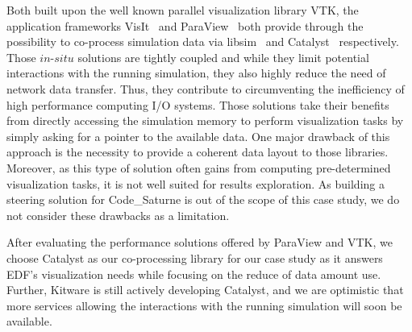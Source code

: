 Both built upon the well known parallel visualization library VTK, 
the application frameworks VisIt~\cite{1532795} and ParaView~\cite{964413} both provide through
the possibility to co-process simulation data via libsim~\cite{2386230} and Catalyst~\cite{6092322} respectively.  
Those $in$-$situ$ solutions are tightly coupled and while they
limit potential interactions with the running simulation, they also highly
reduce the need of network data transfer. Thus, they contribute to circumventing
the inefficiency of high performance computing I/O systems.
Those solutions take their benefits from directly accessing the simulation memory to
perform visualization tasks by simply asking for a pointer to the available
data. One major drawback of this approach is the necessity to provide a coherent data 
layout to those libraries. Moreover, as this type of
solution often gains from computing pre-determined visualization tasks, it is
not well suited for results exploration.  As building a steering solution for Code\_Saturne is out of
the scope of this case study, we do not consider these drawbacks as a limitation. 

After evaluating the performance solutions offered by ParaView and VTK, we choose Catalyst as 
our co-processing library for our case study as it answers EDF's visualization 
needs while focusing on the  reduce of data amount use. Further, Kitware is still actively developing 
Catalyst, and we are optimistic that more services allowing the interactions
with the running simulation will soon be available.

